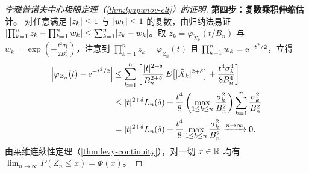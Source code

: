 \begin{proof}[李雅普诺夫中心极限定理（\cref{thm:lyapunov-clt}）的证明]
\textbf{第四步：复数乘积伸缩估计。} 对任意满足 $\lvert z_k\rvert\le 1$ 与 $\lvert w_k\rvert\le 1$ 的复数，由归纳法易证 $\left|\prod_{k=1}^{n}z_k-\prod_{k=1}^{n}w_k\right|\le\sum_{k=1}^{n}\lvert z_k-w_k\rvert$。取 $z_k=\varphi_{\tilde{X}_k}(t/B_n)$ 与 $w_k=\exp\!\left(-\frac{t^2\sigma_k^2}{2B_n^2}\right)$，注意到 $\prod_{k=1}^{n}z_k=\varphi_{Z_n}(t)$ 且 $\prod_{k=1}^{n}w_k=\mathrm{e}^{-t^2/2}$，立得
\[
\begin{aligned}
  \left|\varphi_{Z_n}(t)-\mathrm{e}^{-t^2/2}\right|
  &\le\sum_{k=1}^{n}\left[\frac{\lvert t\rvert^{2+\delta}}{B_n^{2+\delta}}\,E\bigl[\lvert\tilde{X}_k\rvert^{2+\delta}\bigr]+\frac{t^4\sigma_k^4}{8B_n^4}\right]\\
  &\le\lvert t\rvert^{2+\delta}L_n(\delta)+\frac{t^4}{8}\left(\max_{1\le k\le n}\frac{\sigma_k^2}{B_n^2}\right)\sum_{k=1}^{n}\frac{\sigma_k^2}{B_n^2}\\
  &=\lvert t\rvert^{2+\delta}L_n(\delta)+\frac{t^4}{8}\max_{1\le k\le n}\frac{\sigma_k^2}{B_n^2}
  \xrightarrow{n\to\infty} 0.
\end{aligned}
\]
由莱维连续性定理（\cref{thm:levy-continuity}），对一切 $x\in\mathbb{R}$ 均有 $\lim_{n\to\infty}P(Z_n\le x)=\Phi(x)$。
\end{proof}
